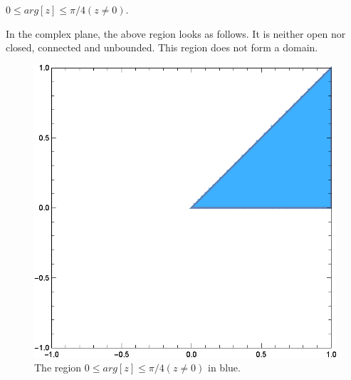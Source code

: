 \documentclass[12pt]{book}
\begin{document}
\begin{exmp}
    $0 \leq arg[z] \leq \pi / 4 (z \neq 0).$
\end{exmp}
In the complex plane, the above region looks as follows. It is neither open nor closed, connected and unbounded. This region does not form a domain.
\begin{figure}[H]
    \centering
    \includegraphics[scale = 0.7]{./figs/chapter_1/region_plot_3.eps}
    \caption{The region $0 \leq arg[z] \leq \pi / 4 (z \neq 0)$ in blue.}
\end{figure}
\end{document}
